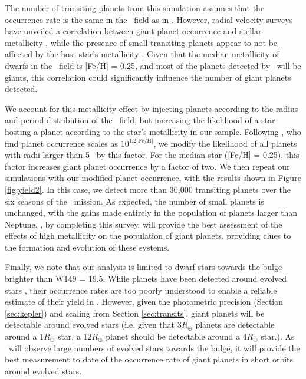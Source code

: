 The number of transiting planets from this simulation assumes that the occurrence rate is the same in the \WF\ field as in \kep.
However, radial velocity surveys have unveiled a correlation between giant planet occurrence and stellar 
metallicity \citep{Fischer05, Johnson10a}, while the presence of small transiting planets appear 
to not be affected by the host star's metallicity \citep{Buchhave15}. Given that the median metallicity of dwarfs in the \WF\ field is [Fe/H] = 0.25, and most of the planets detected by \WF\ will be giants, this correlation could significantly
influence the number of giant planets detected. 

We account for this metallicity effect by injecting planets according to the radius and period distribution of the
\kep\ field, but increasing the likelihood of a star hosting a planet according to the star's 
metallicity in our sample.
Following \citet{Johnson10a}, who find planet occurrence scales as $10^{1.2\textrm{[Fe/H]}}$, we 
modify the likelihood of all planets with radii larger than 5 \rearth\ by this factor.
For the median star ([Fe/H] = 0.25), this factor increases giant planet occurrence by a factor of two.
We then repeat our simulations with our modified planet occurrence, with the results shown in Figure \ref{fig:yield2}. 
In this case, we detect more than 30,000 transiting planets over the six seasons of the \WF\ mission.
As expected, the number of small planets is unchanged, with the gains made entirely in the
population of planets larger than Neptune. 
\WF, by completing this survey, will provide the best assessment of the effects of high 
metallicity on the population of giant planets, providing clues to the formation and evolution
of these systems.

Finally, we note that our analysis is limited to dwarf stars towards the bulge brighter
than W149 = 19.5. While planets have been detected
around evolved stars \citep{Lillo-Box14, Barclay15, Quinn15}, their occurrence rates
are too poorly understood to enable a reliable estimate of their yield in \WF. 
However, given the photometric precision (Section \ref{sec:kepler}) and scaling from Section \ref{sec:transits}, giant planets will be detectable around evolved stars (i.e. given that $3R_{\oplus}$ planets are detectable around a $1 R_{\odot}$ star, a $12R_{\oplus}$ planet should be detectable around a $4 R_{\odot}$ star.).
As \WF\ will observe large numbers of evolved stars towards the bulge, it will provide
the best measurement to date of the occurrence rate of giant planets in short orbits
around evolved stars.




